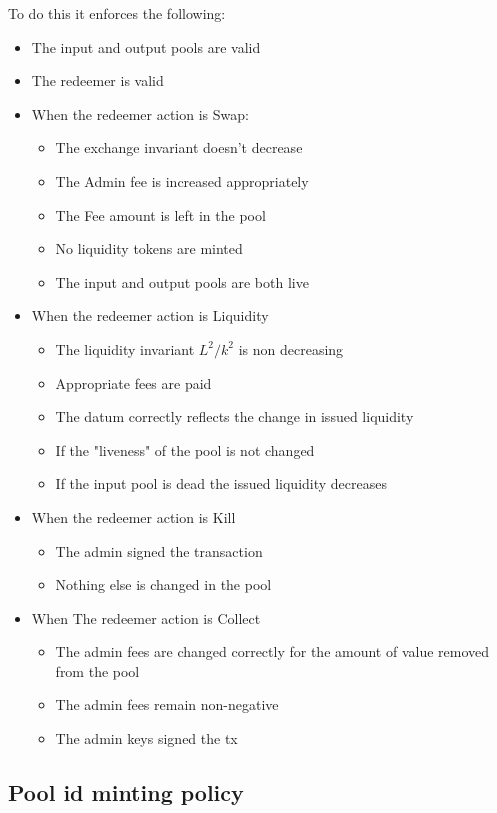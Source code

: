 \documentclass{article}
\begin{document}
To do this it enforces the following:
\begin{itemize}
	\item The input and output pools are valid
	\item The redeemer is valid
	\item When the redeemer action is Swap:
		\begin{itemize}
			\item The exchange invariant doesn't decrease
			\item The Admin fee is increased appropriately
			\item The Fee amount is left in the pool
			\item No liquidity tokens are minted
			\item The input and output pools are both live
		\end{itemize}
	\item When the redeemer action is Liquidity
		\begin{itemize}
			\item The liquidity invariant $L^2/k^2$ is non decreasing
			\item Appropriate fees are paid
			\item The datum correctly reflects the change in issued liquidity
			\item If the "liveness" of the pool is not changed
			\item If the input pool is dead the issued liquidity decreases
		\end{itemize}
	\item When the redeemer action is Kill
		\begin{itemize}
			\item The admin signed the transaction
			\item Nothing else is changed in the pool
		\end{itemize}
	\item When The redeemer action is Collect
		\begin{itemize}
			\item The admin fees are changed correctly
				for the amount of value removed from the pool
			\item The admin fees remain non-negative
			\item The admin keys signed the tx
		\end{itemize}
\end{itemize}


\subsection{Pool id minting policy}
\end{document}
